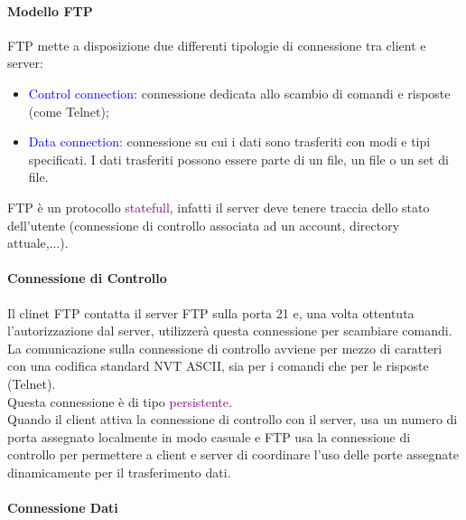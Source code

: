\paragraph{Modello FTP} FTP mette a disposizione due differenti tipologie di connessione tra client e server:
\begin{itemize}
    \item \textcolor{blue}{Control connection:} connessione dedicata allo scambio di comandi e risposte (come Telnet);
    \item \textcolor{blue}{Data connection:} connessione su cui i dati sono trasferiti con modi e tipi specificati. I dati trasferiti possono essere parte di un file, un file o un set di file.
\end{itemize}
 
FTP è un protocollo \textcolor{purple}{statefull}, infatti il server deve tenere traccia dello stato dell'utente (connessione di controllo associata ad un account, directory attuale,...).
\paragraph{Connessione di Controllo} Il clinet FTP contatta il server FTP sulla porta 21 e, una volta ottentuta l'autorizzazione dal server, utilizzerà questa connessione per scambiare comandi. 
La comunicazione sulla connessione di controllo avviene per mezzo di caratteri con una codifica standard NVT ASCII, sia per i comandi che per le risposte (Telnet).
\\Questa connessione è di tipo \textcolor{purple}{persistente}.
\\Quando il client attiva la connessione di controllo con il server, usa un numero di porta assegnato localmente in modo casuale e FTP usa la connessione di controllo per permettere a client e server di coordinare l’uso delle porte assegnate dinamicamente per il trasferimento dati.
 
\paragraph{Connessione Dati} 